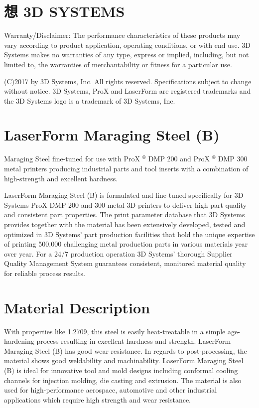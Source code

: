 \documentclass[10pt]{article}
\begin{document}
\section*{想 3D SYSTEMS}
Warranty/Disclaimer: The performance characteristics of these products may vary according to product application, operating conditions, or with end use. 3D Systems makes no warranties of any type, express or implied, including, but not limited to, the warranties of merchantability or fitness for a particular use.

(C)2017 by 3D Systems, Inc. All rights reserved. Specifications subject to change without notice. 3D Systems, ProX and LaserForm are registered trademarks and the 3D Systems logo is a trademark of 3D Systems, Inc.

\section*{LaserForm Maraging Steel (B)}
Maraging Steel fine-tuned for use with ProX ${ }^{\circledR}$ DMP 200 and ProX ${ }^{\circledR}$ DMP 300 metal printers producing industrial parts and tool inserts with a combination of high-strength and excellent hardness.

LaserForm Maraging Steel (B) is formulated and fine-tuned specifically for 3D Systems ProX DMP 200 and 300 metal 3D printers to deliver high part quality and consistent part properties. The print parameter database that 3D Systems provides together with the material has been extensively developed, tested and optimized in 3D Systems' part production facilities that hold the unique expertise of printing 500,000 challenging metal production parts in various materials year over year. For a 24/7 production operation 3D Systems' thorough Supplier Quality Management System guarantees consistent, monitored material quality for reliable process results.

\section*{Material Description}
With properties like 1.2709, this steel is easily heat-treatable in a simple age-hardening process resulting in excellent hardness and strength. LaserForm Maraging Steel (B) has good wear resistance. In regards to post-processing, the material shows good weldability and machinability. LaserForm Maraging Steel (B) is ideal for innovative tool and mold designs including conformal cooling channels for injection molding, die casting and extrusion. The material is also used for high-performance aerospace, automotive and other industrial applications which require high strength and wear resistance.
\end{document}

